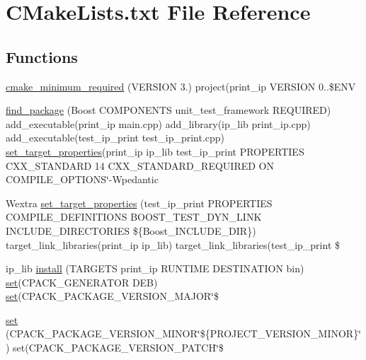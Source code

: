 \hypertarget{CMakeLists_8txt}{}\section{C\+Make\+Lists.\+txt File Reference}
\label{CMakeLists_8txt}
\subsection*{Functions}
\begin{DoxyCompactItemize}
\item 
\hyperlink{CMakeLists_8txt_a149ac2a2c7b91844a3e1b08ae0d9ed3f}{cmake\+\_\+minimum\+\_\+required} (V\+E\+R\+S\+I\+ON 3.) project(print\+\_\+ip V\+E\+R\+S\+I\+ON 0..\$E\+NV
\item 
\hyperlink{CMakeLists_8txt_a0d34b2a0dad72d0f6e9b3498ff841cf1}{find\+\_\+package} (Boost C\+O\+M\+P\+O\+N\+E\+N\+TS unit\+\_\+test\+\_\+framework R\+E\+Q\+U\+I\+R\+ED) add\+\_\+executable(print\+\_\+ip main.\+cpp) add\+\_\+library(ip\+\_\+lib print\+\_\+ip.\+cpp) add\+\_\+executable(test\+\_\+ip\+\_\+print test\+\_\+ip\+\_\+print.\+cpp) \hyperlink{CMakeLists_8txt_a981e44eb2eb86a763ac0609e8597a611}{set\+\_\+target\+\_\+properties}(print\+\_\+ip ip\+\_\+lib test\+\_\+ip\+\_\+print P\+R\+O\+P\+E\+R\+T\+I\+ES C\+X\+X\+\_\+\+S\+T\+A\+N\+D\+A\+RD 14 C\+X\+X\+\_\+\+S\+T\+A\+N\+D\+A\+R\+D\+\_\+\+R\+E\+Q\+U\+I\+R\+ED ON C\+O\+M\+P\+I\+L\+E\+\_\+\+O\+P\+T\+I\+O\+NS\char`\"{}-\/Wpedantic
\item 
Wextra \hyperlink{CMakeLists_8txt_a981e44eb2eb86a763ac0609e8597a611}{set\+\_\+target\+\_\+properties} (test\+\_\+ip\+\_\+print P\+R\+O\+P\+E\+R\+T\+I\+ES C\+O\+M\+P\+I\+L\+E\+\_\+\+D\+E\+F\+I\+N\+I\+T\+I\+O\+NS B\+O\+O\+S\+T\+\_\+\+T\+E\+S\+T\+\_\+\+D\+Y\+N\+\_\+\+L\+I\+NK I\+N\+C\+L\+U\+D\+E\+\_\+\+D\+I\+R\+E\+C\+T\+O\+R\+I\+ES \$\{Boost\+\_\+\+I\+N\+C\+L\+U\+D\+E\+\_\+\+D\+IR\}) target\+\_\+link\+\_\+libraries(print\+\_\+ip ip\+\_\+lib) target\+\_\+link\+\_\+libraries(test\+\_\+ip\+\_\+print \$
\item 
ip\+\_\+lib \hyperlink{CMakeLists_8txt_ad5b09882d4ffa0b2549cdcd18161c85d}{install} (T\+A\+R\+G\+E\+TS print\+\_\+ip R\+U\+N\+T\+I\+ME D\+E\+S\+T\+I\+N\+A\+T\+I\+ON bin) \hyperlink{CMakeLists_8txt_abed8177b0359bb37e78aebe0412cc156}{set}(C\+P\+A\+C\+K\+\_\+\+G\+E\+N\+E\+R\+A\+T\+OR D\+EB) \hyperlink{CMakeLists_8txt_abed8177b0359bb37e78aebe0412cc156}{set}(C\+P\+A\+C\+K\+\_\+\+P\+A\+C\+K\+A\+G\+E\+\_\+\+V\+E\+R\+S\+I\+O\+N\+\_\+\+M\+A\+J\+OR\char`\"{}\$
\item 
\hyperlink{CMakeLists_8txt_abed8177b0359bb37e78aebe0412cc156}{set} (C\+P\+A\+C\+K\+\_\+\+P\+A\+C\+K\+A\+G\+E\+\_\+\+V\+E\+R\+S\+I\+O\+N\+\_\+\+M\+I\+N\+OR\char`\"{}\$\{P\+R\+O\+J\+E\+C\+T\+\_\+\+V\+E\+R\+S\+I\+O\+N\+\_\+\+M\+I\+N\+OR\}\char`\"{}) set(C\+P\+A\+C\+K\+\_\+\+P\+A\+C\+K\+A\+G\+E\+\_\+\+V\+E\+R\+S\+I\+O\+N\+\_\+\+P\+A\+T\+CH\char`\"{}\$
\end{DoxyCompactItemize}

